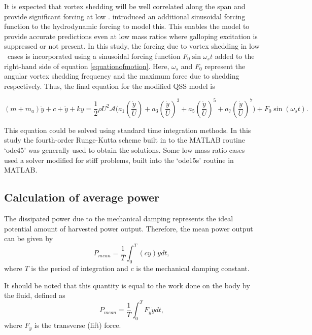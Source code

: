 
 It is expected that vortex shedding will be well correlated along the span and provide significant forcing at low \reynoldsnumber. \citet{Joly2012} introduced  an additional sinusoidal forcing function to the hydrodynamic forcing to model this. This enables the model to provide accurate predictions even at low mass ratios where galloping excitation is suppressed or not present. In this study, the forcing due to vortex shedding in low \reynoldsnumber\ cases is incorporated using a sinusoidal forcing function $F_0\sin{\omega_{s}t}$ added to the right-hand side of equation \ref{equationofmotion}. Here, $\omega_{s}$ and $F_0$ represent the angular vortex shedding frequency and the maximum force due to shedding respectively. Thus, the final equation for the modified QSS model is

\begin{equation}
\label{final_equation_motion}
(m{+}m_a)\ddot{y}{+}c{+}\dot{y}{+}ky{=}\frac{1}{2}\rho U^2 \mathcal  {A} \Bigg(a_1\left(\frac{\dot{y}}{U}\right){+}a_3\left(\frac{\dot{y}}{U}\right)^3{+}a_5\left(\frac{\dot{y}}{U}\right)^5{+}a_7\left(\frac{\dot{y}}{U}\right)^7 \Bigg){+} F_0\sin{(\omega_s t)}.
\end{equation}

This equation could be solved using standard time integration methods. In  this study the fourth-order Runge-Kutta scheme built in to the MATLAB routine `ode45' was generally used to obtain the solutions. Some low mass ratio cases used a solver modified for stiff problems, built into the `ode15s' routine in MATLAB.

\subsection{Calculation of average power}

 The dissipated power due to the mechanical damping represents the ideal potential amount of harvested power output. Therefore, the mean power output can be given by
\begin{equation}
\label{power}
P_{mean}=\frac{1}{T}\int_{0}^{T}(c\dot{y})\dot{y} dt,
\end{equation}
where $T$ is the period of integration and $c$ is the mechanical damping constant. 

It should be noted that this quantity is equal to the work done on the body by the fluid, defined as
\begin{equation}
\label{power_alt}
P_{mean}=\frac{1}{T}\int_{0}^{T}F_y\dot{y} dt,
\end{equation}
where $F_y$ is the transverse (lift) force.

